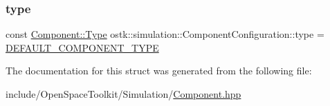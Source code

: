 \mbox{\label{structostk_1_1simulation_1_1_component_configuration_abd0e836f95e58db5c8e954469101a2c8}} 
\subsubsection{\texorpdfstring{type}{type}}
{\footnotesize\ttfamily const \hyperlink{classostk_1_1simulation_1_1_component_a1d2ded63a8ab0bd81e27f25921be1e20}{Component\+::\+Type} ostk\+::simulation\+::\+Component\+Configuration\+::type = \hyperlink{_component_8hpp_a0e5d3d0d9b45cdf8c94ed8df0d00c3e3}{D\+E\+F\+A\+U\+L\+T\+\_\+\+C\+O\+M\+P\+O\+N\+E\+N\+T\+\_\+\+T\+Y\+PE}}



The documentation for this struct was generated from the following file\+:\begin{DoxyCompactItemize}
\item 
include/\+Open\+Space\+Toolkit/\+Simulation/\hyperlink{_component_8hpp}{Component.\+hpp}\end{DoxyCompactItemize}
